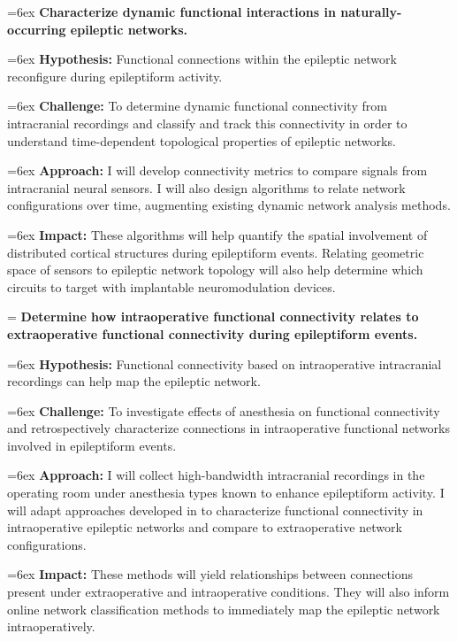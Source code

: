 


\hangindent=6ex
\noindent
{} \textbf{Characterize dynamic functional interactions in naturally-occurring epileptic networks.}

\hangindent=6ex
\textbf{Hypothesis:} Functional connections within the epileptic network reconfigure during epileptiform activity.

\hangindent=6ex
\textbf{Challenge:} To determine dynamic functional connectivity from intracranial recordings and classify and track this connectivity in order to understand time-dependent topological properties of epileptic networks.

\hangindent=6ex
\textbf{Approach:} I will develop connectivity metrics to compare signals from intracranial neural sensors. I will also design algorithms to relate network configurations over time, augmenting existing dynamic network analysis methods.

\hangindent=6ex
\textbf{Impact:} These algorithms will help quantify the spatial involvement of distributed cortical structures during epileptiform events. Relating geometric space of sensors to epileptic network topology will also help determine which circuits to target with implantable neuromodulation devices.


\hangindent=\parindent
{}
\noindent
{} \textbf{Determine how intraoperative functional connectivity relates to extraoperative functional connectivity during epileptiform events.}

\hangindent=6ex
\textbf{Hypothesis:} Functional connectivity based on intraoperative intracranial recordings can help map the epileptic network.

\hangindent=6ex
\textbf{Challenge:} To investigate effects of anesthesia on functional connectivity and retrospectively characterize connections in intraoperative functional networks involved in epileptiform events.

\hangindent=6ex
\textbf{Approach:} I will collect high-bandwidth intracranial recordings in the operating room under anesthesia types known to enhance epileptiform activity. I will adapt approaches developed in  to characterize functional connectivity in intraoperative epileptic networks and compare to extraoperative network configurations.

\hangindent=6ex
\textbf{Impact:} These methods will yield relationships between connections present under extraoperative and intraoperative conditions. They will also inform online network classification methods to immediately map the epileptic network intraoperatively.



